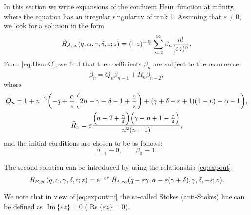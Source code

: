\documentclass[11pt]{article}
\newcommand{\MF}[1]{\mathop{#1}\nolimits}
\renewcommand{\Re}{\MF{\mathrm{Re}}} \renewcommand{\Im}{\MF{\mathrm{Im}}}
\def\HeunC{\displaystyle\setbox0=\hbox{\tiny\itshape\bfseries \kern1.52mm c}\wd0=0pt\ht0=0pt\dp0=0pt\MF{\textit{\hbox{\raise1.67ex\copy0}H\/}}}%
\begin{document}
In this section we write expansions of the confluent Heun function at infinity, where the equation has an irregular singularity of rank 1.
Assuming that $\varepsilon\neq0$, we look for a solution in the form
\begin{equation}
\HeunC_{\!A,\infty}(q,\alpha,\gamma,\delta,\varepsilon;z)=(-z)^{-\frac{\alpha}{\varepsilon}}\sum_{n=0}^{\infty} \beta_n \frac{n!}{(\varepsilon z)^n}.
\label{eq:HeunAinfseries}
\end{equation}
From \eqref{eq:HeunC}, we find that the coefficients $\beta_n$ are subject to the 
recurrence
\begin{equation*}
  \beta_n=\tilde{Q}_n \beta_{n-1}+\tilde{R}_n \beta_{n-2},
\label{eq:HeunAinfdef}
\end{equation*}
where
\begin{equation*}
\begin{gathered}
\tilde{Q}_n = 1+n^{-2}\biggl(-q+\frac{\alpha}{\varepsilon}\biggl(2n-\gamma-\delta-1+\frac{\alpha}{\varepsilon}\biggr)
 +(\gamma+\delta-\varepsilon+1)(1-n)+\alpha-1\biggr),\\ 
\tilde{R}_n = \varepsilon\frac{\Bigl(n-2+\frac{\alpha}{\varepsilon}\Bigr)\Bigl(\gamma-n+1-\frac{\alpha}{\varepsilon}\Bigr)}{n^2(n-1)},
\end{gathered}
\label{eq:AinfPQRdef}
\end{equation*}
and the initial conditions are chosen to be as follows:
\[
\beta_{-1}=0,\qquad \beta_0=1.
\]

The second solution can be introduced by using the relationship \eqref{eq:expout}:
\begin{equation}
\HeunC_{\!B,\infty}(q,\alpha,\gamma,\delta,\varepsilon;z)=\E{-\varepsilon z}\HeunC_{\!A,\infty}(q-\varepsilon\gamma,\alpha-\varepsilon(\gamma+\delta),\gamma,\delta,-\varepsilon;z).
\label{eq:expoutinf}
\end{equation}

We note that in view of \eqref{eq:expoutinf} the so-called Stokes (anti-Stokes) line can be defined as $\Im\{\varepsilon z\}=0$ ($\Re\{\varepsilon z\}=0$).
\end{document}
